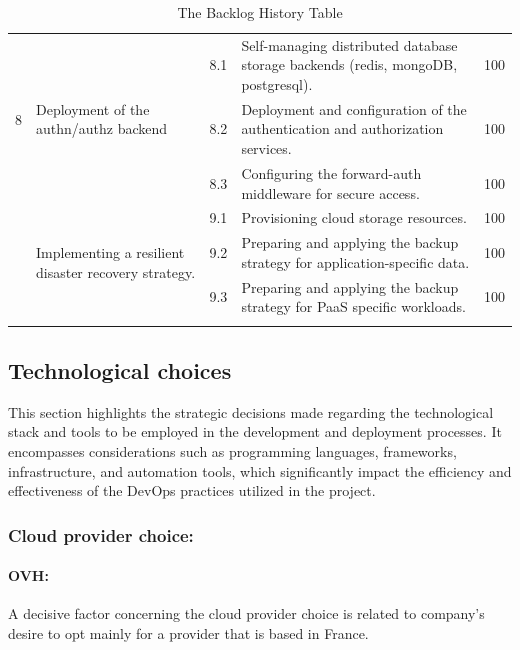 \begin{longtable}[H]{|m{1cm}|m{3.25cm}|m{1cm}|m{7cm}|m{1.2cm}|}
\multirow{3}{1cm}{8} & \multirow{3}{3.25cm}{\raggedright Deployment of the authn/authz backend} 	& 8.1 & \raggedright Self-managing distributed database storage backends (redis, mongoDB, postgresql).	 & 100\\
\cline{3-5}
&   & 8.2 &	\raggedright Deployment and configuration of the authentication and authorization services.	 & 100\\
\cline{3-5}
&   & 8.3 &	\raggedright Configuring the forward-auth middleware for secure access.	 & 100\\
   \hline
   \pagebreak
   \hline
\multirow{3}{1cm}{9} & \multirow{3}{3.25cm}{\raggedright Implementing a resilient disaster recovery strategy.} & 9.1 &\raggedright  Provisioning cloud storage resources.		 & 100\\
\cline{3-5}
&   & 9.2 & \raggedright Preparing and applying the backup strategy for application-specific data.	 & 100\\
\cline{3-5}
&   & 9.3 &	\raggedright Preparing and applying the backup strategy for PaaS specific workloads.	 & 100\\
 \hline
\caption{ The Backlog History Table }
\end{longtable}

\subsection{Technological choices }
\hspace{7mm}This section highlights the strategic decisions made regarding the technological stack and tools to be employed in the development and deployment processes. It encompasses considerations such as programming languages, frameworks, infrastructure, and automation tools, which significantly impact the efficiency and effectiveness of the DevOps practices utilized in the project.
\subsubsection{Cloud provider choice: } 
\paragraph{OVH\cite{OVHcloud}: }

A decisive factor concerning the cloud provider choice is related to company’s desire to opt mainly for a provider that is based in France.  

